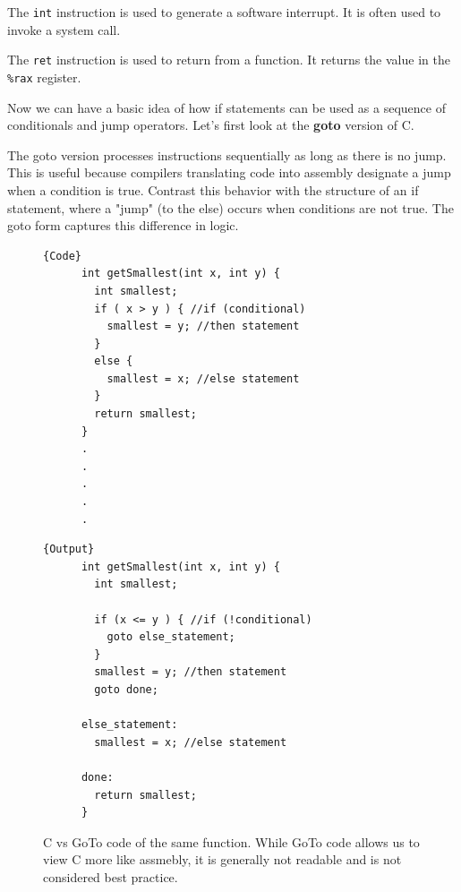   \begin{definition}[int]
    The \texttt{int} instruction is used to generate a software interrupt. It is often used to invoke a system call.
  \end{definition}

  \begin{definition}[ret]
    The \texttt{ret} instruction is used to return from a function. It returns the value in the \texttt{\%rax} register. 
  \end{definition}

  Now we can have a basic idea of how if statements can be used as a sequence of conditionals and jump operators. Let's first look at the \textbf{goto} version of C. 

  \begin{definition}
    The goto version processes instructions sequentially as long as there is no jump. This is useful because compilers translating code into assembly designate a jump when a condition is true. Contrast this behavior with the structure of an if statement, where a "jump" (to the else) occurs when conditions are not true. The goto form captures this difference in logic.
  \end{definition}

  \begin{figure}[H]
    \centering 
    \noindent\begin{minipage}{.5\textwidth}
    \begin{lstlisting}[]{Code}
      int getSmallest(int x, int y) {
        int smallest;
        if ( x > y ) { //if (conditional)
          smallest = y; //then statement
        }
        else {
          smallest = x; //else statement
        }
        return smallest;
      }
      .
      .
      .
      .
      .
    \end{lstlisting}
    \end{minipage}
    \hfill
    \begin{minipage}{.49\textwidth}
    \begin{lstlisting}[]{Output}
      int getSmallest(int x, int y) {
        int smallest;

        if (x <= y ) { //if (!conditional)
          goto else_statement;
        }
        smallest = y; //then statement
        goto done;

      else_statement:
        smallest = x; //else statement

      done:
        return smallest;
      }      
    \end{lstlisting}
    \end{minipage}
    \caption{C vs GoTo code of the same function. While GoTo code allows us to view C more like assmebly, it is generally not readable and is not considered best practice. } 
    \label{fig:c_vs_goto}
  \end{figure}

